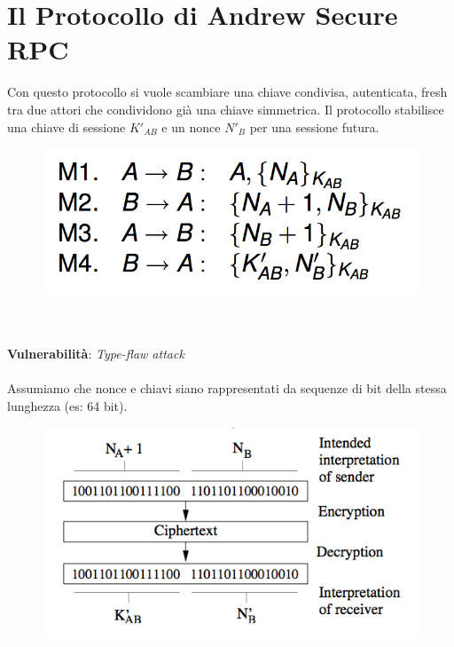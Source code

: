 \documentclass[11pt, a4paper, twoside, italian]{report}
\theoremstyle{plain}
\begin{document}
\section*{Il Protocollo di Andrew Secure RPC}
\begin{multicols}{2}
	\noindent
	Con questo protocollo si vuole scambiare una chiave condivisa, autenticata, fresh tra due attori che condividono già una chiave simmetrica. Il protocollo stabilisce una chiave di sessione $K'_{AB}$ e un nonce $N'_{B}$ per una sessione futura.
\columnbreak
	\begin{figure}[H]
		\centering
		\includegraphics[scale=0.4]{andrewsecurerpc}
	\end{figure}
\end{multicols}

\begin{multicols}{2}
	~\\\\
\textbf{Vulnerabilità}: \textit{Type-flaw attack}
\\\\
Assumiamo che nonce e chiavi siano rappresentati da sequenze di bit della stessa lunghezza (es: 64 bit).
\columnbreak
	\begin{figure}[H]
		\centering
		\includegraphics[scale=0.8]{andrewsecurerpctypeflaw}
	\end{figure}
\end{multicols}
\end{document}
